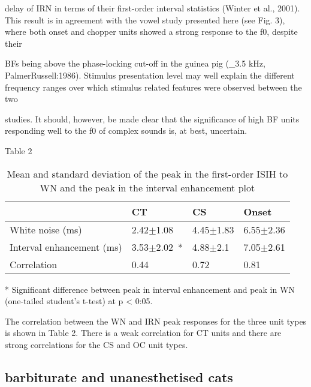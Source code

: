 \documentclass[10pt,a4paper]{article}
\begin{document}
delay of IRN in terms of their first-order interval statistics (Winter et al.,
2001). This result is in agreement with the vowel study presented here (see
Fig. 3), where both onset and chopper units showed a strong response to the f0,
despite their

BFs being above the phase-locking cut-off in the guinea pig (\_3.5 kHz,
PalmerRussell:1986). Stimulus presentation level may well explain the different
frequency ranges over which stimulus related features were observed between the
two

studies. It should, however, be made clear that the significance of high BF
units responding well to the f0 of complex sounds is, at best, uncertain.

Table 2

\begin{table}[h]
  \centering

  \caption{Mean and standard deviation of the peak in the first-order ISIH to WN and the peak in the interval enhancement plot}
  

\begin{tabularx}{\textwidth}{XXXX}
\toprule
                          &       CT       &     CS     & Onset \\ \midrule
    White noise (ms)      &   2.42$\pm$1.08   & 4.45$\pm$1.83 & 6.55$\pm$2.36 \\
Interval enhancement (ms) & 3.53$\pm$2.02\, *& 4.88$\pm$2.1  & 7.05$\pm$2.61\\
       Correlation        &      0.44      &    0.72    & 0.81 \\
\bottomrule
\end{tabularx}
\footnotesize{* Significant difference between peak in interval enhancement
and peak in WN (one-tailed student's t{}-test) at p {\textless} 0:05.}
\end{table}

The correlation between the WN and IRN peak responses for the three unit types
is shown in Table 2. There is a weak correlation for CT units and there are
strong correlations for the CS and OC unit types.

\subsection{\citep{RhodeKettner:1987} barbiturate and unanesthetised cats}
\end{document}
